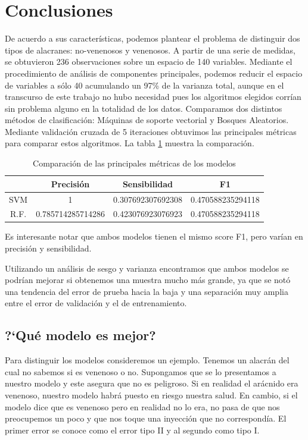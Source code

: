 \documentclass[a4paper, 10pt]{article}
\begin{document}
\section{Conclusiones}
De acuerdo a sus características, podemos plantear el problema de distinguir dos tipos de alacranes: no-venenosos y venenosos. A partir de una serie de medidas, se obtuvieron 236 observaciones sobre un espacio de 140 variables. Mediante el procedimiento de análisis de componentes principales, podemos reducir el espacio de variables a sólo 40 acumulando un 97\% de la varianza total, aunque en el transcurso de este trabajo no hubo necesidad pues los algoritmos elegidos corrían sin problema alguno en la totalidad de los datos.
Comparamos dos distintos métodos de clasificación: Máquinas de soporte vectorial y Bosques Aleatorios. Mediante validación cruzada de 5 iteraciones obtuvimos las principales métricas para comparar estos algoritmos. La tabla \ref{tbl:compMod} muestra la comparación.

\begin{table}
  \centering
  \caption{Comparación de las principales métricas de los modelos}
  \begin{tabular}{|c|c|c|c|}
    \hline
    & \textbf{Precisión} & \textbf{Sensibilidad} & \textbf{F1}\\
    \hline
    SVM & 1 & 0.307692307692308 & 0.470588235294118\\
    \hline
    R.F. & 0.785714285714286 & 0.423076923076923 & 0.470588235294118\\
    \hline
  \end{tabular}
  \label{tbl:compMod}
\end{table}

Es interesante notar que ambos modelos tienen el mismo score F1, pero varían en precisión y sensibilidad. 

Utilizando un análisis de sesgo y varianza encontramos que ambos modelos se podrían mejorar si obtenemos una muestra mucho más grande, ya que se notó una tendencia del error de prueba hacia la baja y una separación muy amplia entre el error de validación y el de entrenamiento.

\subsection{?`Qué modelo es mejor?}
Para distinguir los modelos consideremos un ejemplo. Tenemos un alacrán del cual no sabemos si es venenoso o no. Supongamos que se lo presentamos a nuestro modelo y este asegura que no es peligroso. Si en realidad el arácnido era venenoso, nuestro modelo habrá puesto en riesgo nuestra salud. En cambio, si el modelo dice que es venenoso pero en realidad no lo era, no pasa de que nos preocupemos un poco y que nos toque una inyección que no correspondía. El primer error se conoce como el error tipo II y al segundo como tipo I.
\end{document}
